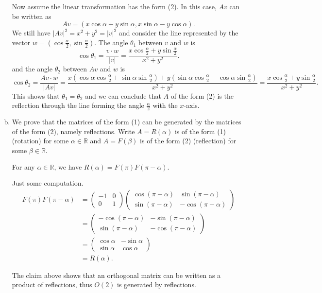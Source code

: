 \documentclass[a4paper, 12pt]{article}
\begin{document}
\begin{solution}
\begin{enumerate}[(a)]
Now assume the linear transformation has the form (2). In this case, \(Av\) can be written as 
\[Av=(x\cos \alpha+y\sin \alpha,x\sin \alpha-y\cos \alpha).\]
We still have \(|Av|^2=x^2+y^2=|v|^2\) and consider the line represented by the vector \(w=(\cos \frac{\alpha}{2},\sin \frac{\alpha}{2})\). The angle \(\theta_1\) between \(v\) and \(w\) is 
\[\cos \theta_1=\dfrac{v\cdot w}{|v|}=\dfrac{x\cos \frac{\alpha}{2}+y\sin \frac{\alpha}{2}}{x^2+y^2}.\]
and the angle \(\theta_2\) between \(Av\) and \(w\) is 
\[\cos \theta_2=\dfrac{Av\cdot w}{|Av|}=\dfrac{x(\cos \alpha\cos \frac{\alpha}{2}+\sin \alpha\sin \frac{\alpha}{2})+y(\sin \alpha\cos \frac{\alpha}{2}-\cos \alpha\sin \frac{\alpha}{2})}{x^2+y^2}=\dfrac{x\cos \frac{\alpha}{2}+y\sin \frac{\alpha}{2}}{x^2+y^2}.\]
This shows that \(\theta_1=\theta_2\) and we can conclude that \(A\) of the form (2) is the reflection through the line forming the angle \(\frac{\alpha}{2}\) with the \(x\)-axis.
\item We prove that the matrices of the form (1) can be generated by the matrices of the form (2), namely reflections. Write \(A=R(\alpha)\) is of the form (1) (rotation) for some \(\alpha\in \mathbb{R}\) and \(A=F(\beta)\) is of the form (2) (reflection) for some \(\beta\in \mathbb{R}\). 
\begin{claim}
For any \(\alpha\in \mathbb{R}\), we have \(R(\alpha)=F(\pi)F(\pi-\alpha)\).
\end{claim}
\begin{claimproof}
Just some computation. 
\begin{align*}
            F(\pi)F(\pi-\alpha)&=\begin{pmatrix}
                -1&0\\ 
                0&1
            \end{pmatrix}\begin{pmatrix}
                \cos(\pi-\alpha)&\sin (\pi-\alpha) \\ 
                \sin(\pi-\alpha)&-\cos (\pi-\alpha)
            \end{pmatrix}\\ 
            &=\begin{pmatrix}
                -\cos(\pi-\alpha)& -\sin(\pi-\alpha)\\ 
                \sin(\pi-\alpha)&-\cos (\pi-\alpha)
            \end{pmatrix}\\ 
            &=\begin{pmatrix}
                \cos \alpha&-\sin \alpha\\ 
                \sin \alpha&\cos \alpha
            \end{pmatrix}\\ 
            &=R(\alpha).
\end{align*}
\end{claimproof}

The claim above shows that an orthogonal matrix can be written as a product of reflections, thus \(O(2)\) is generated by reflections.
\end{enumerate}
\end{solution}
\end{document}
